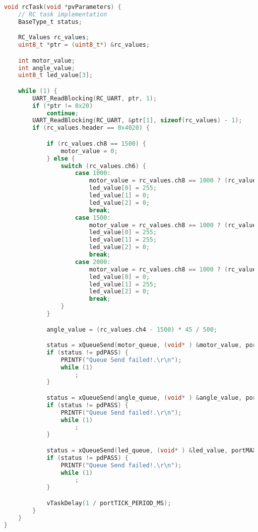 \begin{lstlisting}[language=c,caption=RC Task, label=list:rc]
void rcTask(void *pvParameters) {
    // RC task implementation
    BaseType_t status;

    RC_Values rc_values;
    uint8_t *ptr = (uint8_t*) &rc_values;

    int motor_value;
    int angle_value;
    uint8_t led_value[3];

    while (1) {
        UART_ReadBlocking(RC_UART, ptr, 1);
        if (*ptr != 0x20)
            continue;
        UART_ReadBlocking(RC_UART, &ptr[1], sizeof(rc_values) - 1);
        if (rc_values.header == 0x4020) {

            if (rc_values.ch8 == 1500) {
                motor_value = 0;
            } else {
                switch (rc_values.ch6) {
                    case 1000:
                        motor_value = rc_values.ch8 == 1000 ? (rc_values.ch2 - 1000) / 50 : (rc_values.ch2 - 1000) / -50;
                        led_value[0] = 255;
                        led_value[1] = 0;
                        led_value[2] = 0;
                        break;
                    case 1500:
                        motor_value = rc_values.ch8 == 1000 ? (rc_values.ch2 - 1000) / 20 : (rc_values.ch2 - 1000) / -20;
                        led_value[0] = 255;
                        led_value[1] = 255;
                        led_value[2] = 0;
                        break;
                    case 2000:
                        motor_value = rc_values.ch8 == 1000 ? (rc_values.ch2 - 1000) / 10 : (rc_values.ch2 - 1000) / -10;
                        led_value[0] = 0;
                        led_value[1] = 255;
                        led_value[2] = 0;
                        break;
                }
            }

            angle_value = (rc_values.ch4 - 1500) * 45 / 500;

            status = xQueueSend(motor_queue, (void* ) &motor_value, portMAX_DELAY);
            if (status != pdPASS) {
                PRINTF("Queue Send failed!.\r\n");
                while (1)
                    ;
            }

            status = xQueueSend(angle_queue, (void* ) &angle_value, portMAX_DELAY);
            if (status != pdPASS) {
                PRINTF("Queue Send failed!.\r\n");
                while (1)
                    ;
            }

            status = xQueueSend(led_queue, (void* ) &led_value, portMAX_DELAY);
            if (status != pdPASS) {
                PRINTF("Queue Send failed!.\r\n");
                while (1)
                    ;
            }

            vTaskDelay(1 / portTICK_PERIOD_MS);
        }
    }
}
\end{lstlisting}
